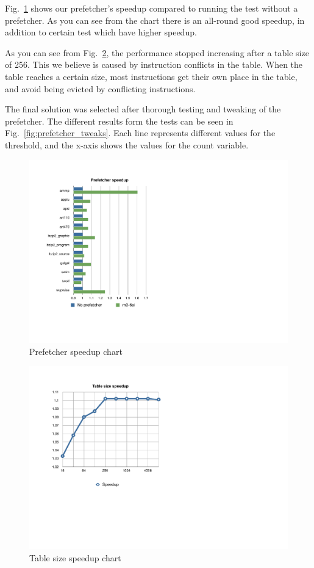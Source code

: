 Fig.~\ref{fig:prefetcher_speedup} shows our prefetcher's speedup compared to
running the test without a prefetcher. As you can see from the chart there is
an all-round good speedup, in addition to certain test which have higher
speedup.

As you can see from Fig.~\ref{fig:table_size_chart}, the performance stopped
increasing after a table size of 256. This we believe is caused by instruction
conflicts in the table. When the table reaches a certain size, most
instructions get their own place in the table, and avoid being evicted by
conflicting instructions.

The final solution was selected after thorough testing and tweaking of the
prefetcher. The different results form the tests can be seen in
Fig.~\ref{fig:prefetcher_tweaks}. Each line represents different values for the
threshold, and the x-axis shows the values for the count variable.

\begin{figure}
	\centering \includegraphics[scale=0.7]{img/prefetcher_chart.pdf}
	\caption{Prefetcher speedup chart}
	\label{fig:prefetcher_speedup}
\end{figure}

\begin{figure}
	\centering \includegraphics[scale=0.7]{img/table_size_chart.pdf}
	\caption{Table size speedup chart}
	\label{fig:table_size_chart}
\end{figure}

